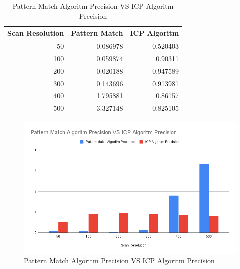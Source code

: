 \documentclass[conference]{IEEEtran}
\begin{document}
\begin{table}[htbp]
\caption{Pattern Match Algoritm Precision VS ICP Algoritm Precision}
\begin{center}
\begin{tabular}{|r|r|r|}
\hline
\multicolumn{1}{|l|}{Scan Resolution} & \multicolumn{1}{l|}{Pattern Match} & \multicolumn{1}{l|}{ICP Algoritm} \\ \hline
50                                    & 0.086978                                              & 0.520403                                    \\ \hline
100                                   & 0.059874                                              & 0.90311                                     \\ \hline
200                                   & 0.020188                                              & 0.947589                                    \\ \hline
300                                   & 0.143696                                              & 0.913981                                    \\ \hline
400                                   & 1.795881                                              & 0.86157                                     \\ \hline
500                                   & 3.327148                                              & 0.825105                                    \\ \hline
\end{tabular}
\label{tab1}
\end{center}
\end{table}

\begin{figure}[htbp]
\centerline{\includegraphics[width=\linewidth]{../result/Pattern_Match_Algoritm_Precision_VS_ICP_Algoritm_Precision.png}}
\caption{Pattern Match Algoritm Precision VS ICP Algoritm Precision}
\label{PrecisionFig}
\end{figure}
\end{document}
